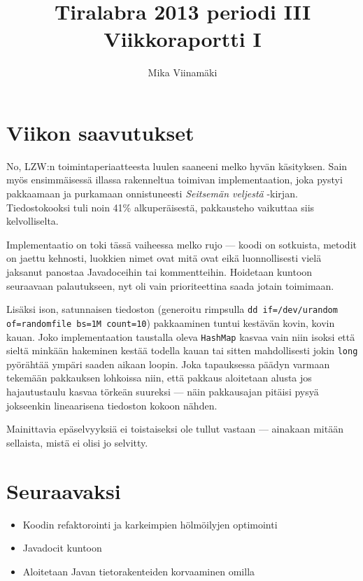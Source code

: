 \documentclass{article}
\begin{document}
\title{Tiralabra 2013 periodi III \\ Viikkoraportti I}
\author{Mika Viinamäki}
\maketitle

\section{Viikon saavutukset}
No, LZW:n toimintaperiaatteesta luulen saaneeni melko hyvän käsityksen. Sain myös ensimmäisessä illassa rakenneltua toimivan implementaation, joka pystyi pakkaamaan ja purkamaan onnistuneesti \emph{Seitsemän veljestä} -kirjan. Tiedostokooksi tuli noin 41\% alkuperäisestä, pakkausteho vaikuttaa siis kelvolliselta.

Implementaatio on toki tässä vaiheessa melko rujo --- koodi on sotkuista, metodit on jaettu kehnosti, luokkien nimet ovat mitä ovat eikä luonnollisesti vielä jaksanut panostaa Javadoceihin tai kommentteihin. Hoidetaan kuntoon seuraavaan palautukseen, nyt oli vain prioriteettina saada jotain toimimaan.

Lisäksi ison, satunnaisen tiedoston (generoitu rimpsulla \texttt{dd if=/dev/urandom of=randomfile bs=1M count=10}) pakkaaminen tuntui kestävän kovin, kovin kauan. Joko implementaation taustalla oleva \verb=HashMap= kasvaa vain niin isoksi että sieltä minkään hakeminen kestää todella kauan tai sitten mahdollisesti jokin \verb=long= pyörähtää ympäri saaden aikaan loopin. Joka tapauksessa päädyn varmaan tekemään pakkauksen lohkoissa niin, että pakkaus aloitetaan alusta jos hajautustaulu kasvaa törkeän suureksi --- näin pakkausajan pitäisi pysyä jokseenkin lineaarisena tiedoston kokoon nähden.

Mainittavia epäselvyyksiä ei toistaiseksi ole tullut vastaan --- ainakaan mitään sellaista, mistä ei olisi jo selvitty.

\section{Seuraavaksi}

\begin{itemize}
    \item Koodin refaktorointi ja karkeimpien hölmöilyjen optimointi
    \item Javadocit kuntoon
    \item Aloitetaan Javan tietorakenteiden korvaaminen omilla
\end{itemize}
\end{document}
